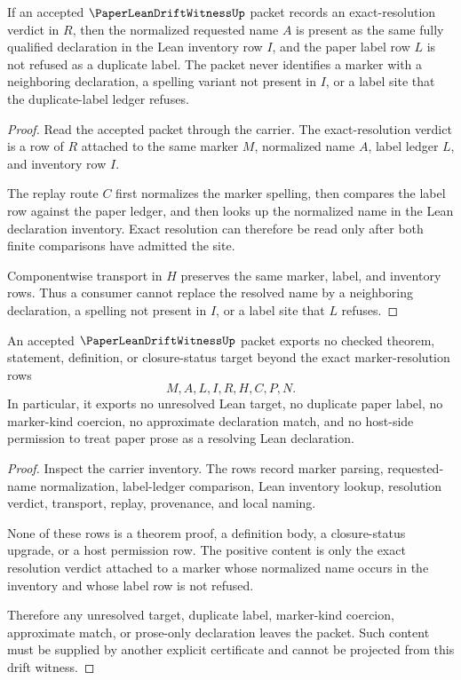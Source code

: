 \begin{theorem}
\label{thm:paper-lean-drift-witness-resolution-exactness}
If an accepted $\PaperLeanDriftWitnessUp$ packet records an exact-resolution verdict in $R$, then the normalized requested name $A$ is present as the same fully qualified declaration in the Lean inventory row $I$, and the paper label row $L$ is not refused as a duplicate label. The packet never identifies a marker with a neighboring declaration, a spelling variant not present in $I$, or a label site that the duplicate-label ledger refuses.
\end{theorem}
\begin{proof}
Read the accepted packet through the carrier. The exact-resolution verdict is a row of $R$ attached to the same marker $M$, normalized name $A$, label ledger $L$, and inventory row $I$.

The replay route $C$ first normalizes the marker spelling, then compares the label row against the paper ledger, and then looks up the normalized name in the Lean declaration inventory. Exact resolution can therefore be read only after both finite comparisons have admitted the site.

Componentwise transport in $H$ preserves the same marker, label, and inventory rows. Thus a consumer cannot replace the resolved name by a neighboring declaration, a spelling not present in $I$, or a label site that $L$ refuses.
\end{proof}

\begin{theorem}
\label{thm:paper-lean-drift-witness-nonescape}
An accepted $\PaperLeanDriftWitnessUp$ packet exports no checked theorem, statement, definition, or closure-status target beyond the exact marker-resolution rows
$$
M,A,L,I,R,H,C,P,N.
$$
In particular, it exports no unresolved Lean target, no duplicate paper label, no marker-kind coercion, no approximate declaration match, and no host-side permission to treat paper prose as a resolving Lean declaration.
\end{theorem}
\begin{proof}
Inspect the carrier inventory. The rows record marker parsing, requested-name normalization, label-ledger comparison, Lean inventory lookup, resolution verdict, transport, replay, provenance, and local naming.

None of these rows is a theorem proof, a definition body, a closure-status upgrade, or a host permission row. The positive content is only the exact resolution verdict attached to a marker whose normalized name occurs in the inventory and whose label row is not refused.

Therefore any unresolved target, duplicate label, marker-kind coercion, approximate match, or prose-only declaration leaves the packet. Such content must be supplied by another explicit certificate and cannot be projected from this drift witness.
\end{proof}

